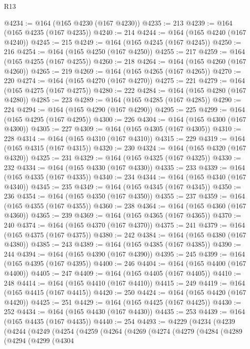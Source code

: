 \begin{lexlean}{R13}
\begin{coremodule}
@4234 := @164 (@165 @4230 (@167 @4230))
@4235 := 213
@4239 := @164 (@165 @4235 (@167 @4235))
@4240 := 214
@4244 := @164 (@165 @4240 (@167 @4240))
@4245 := 215
@4249 := @164 (@165 @4245 (@167 @4245))
@4250 := 216
@4254 := @164 (@165 @4250 (@167 @4250))
@4255 := 217
@4259 := @164 (@165 @4255 (@167 @4255))
@4260 := 218
@4264 := @164 (@165 @4260 (@167 @4260))
@4265 := 219
@4269 := @164 (@165 @4265 (@167 @4265))
@4270 := 220
@4274 := @164 (@165 @4270 (@167 @4270))
@4275 := 221
@4279 := @164 (@165 @4275 (@167 @4275))
@4280 := 222
@4284 := @164 (@165 @4280 (@167 @4280))
@4285 := 223
@4289 := @164 (@165 @4285 (@167 @4285))
@4290 := 224
@4294 := @164 (@165 @4290 (@167 @4290))
@4295 := 225
@4299 := @164 (@165 @4295 (@167 @4295))
@4300 := 226
@4304 := @164 (@165 @4300 (@167 @4300))
@4305 := 227
@4309 := @164 (@165 @4305 (@167 @4305))
@4310 := 228
@4314 := @164 (@165 @4310 (@167 @4310))
@4315 := 229
@4319 := @164 (@165 @4315 (@167 @4315))
@4320 := 230
@4324 := @164 (@165 @4320 (@167 @4320))
@4325 := 231
@4329 := @164 (@165 @4325 (@167 @4325))
@4330 := 232
@4334 := @164 (@165 @4330 (@167 @4330))
@4335 := 233
@4339 := @164 (@165 @4335 (@167 @4335))
@4340 := 234
@4344 := @164 (@165 @4340 (@167 @4340))
@4345 := 235
@4349 := @164 (@165 @4345 (@167 @4345))
@4350 := 236
@4354 := @164 (@165 @4350 (@167 @4350))
@4355 := 237
@4359 := @164 (@165 @4355 (@167 @4355))
@4360 := 238
@4364 := @164 (@165 @4360 (@167 @4360))
@4365 := 239
@4369 := @164 (@165 @4365 (@167 @4365))
@4370 := 240
@4374 := @164 (@165 @4370 (@167 @4370))
@4375 := 241
@4379 := @164 (@165 @4375 (@167 @4375))
@4380 := 242
@4384 := @164 (@165 @4380 (@167 @4380))
@4385 := 243
@4389 := @164 (@165 @4385 (@167 @4385))
@4390 := 244
@4394 := @164 (@165 @4390 (@167 @4390))
@4395 := 245
@4399 := @164 (@165 @4395 (@167 @4395))
@4400 := 246
@4404 := @164 (@165 @4400 (@167 @4400))
@4405 := 247
@4409 := @164 (@165 @4405 (@167 @4405))
@4410 := 248
@4414 := @164 (@165 @4410 (@167 @4410))
@4415 := 249
@4419 := @164 (@165 @4415 (@167 @4415))
@4420 := 250
@4424 := @164 (@165 @4420 (@167 @4420))
@4425 := 251
@4429 := @164 (@165 @4425 (@167 @4425))
@4430 := 252
@4434 := @164 (@165 @4430 (@167 @4430))
@4435 := 253
@4439 := @164 (@165 @4435 (@167 @4435))
@4440 := 254
@4493 := @4229
    (@4234
      (@4239
        (@4244
          (@4249
            (@4254
              (@4259
                (@4264
                  (@4269
                    (@4274
                      (@4279
                        (@4284
                          (@4289
                            (@4294
                              (@4299
                                (@4304

\end{coremodule}
\end{lexlean}
